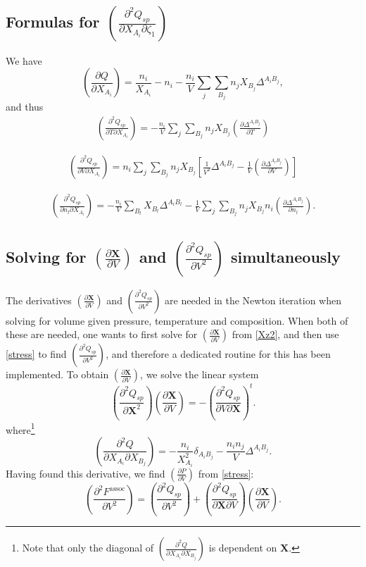\documentclass[english]{../thermomemo/thermomemo}
\newcommand{\mbf}[0]{\mathbf}
\newcommand*{\pder}[2]{\left(\frac{\partial #1}{\partial #2}\right)}
\newcommand*{\pdder}[2]{\left(\frac{\partial^2 #1}{\partial #2^2}\right)}
\newcommand*{\pdcross}[3]{\left(\frac{\partial^2 #1}{\partial #2 \partial #3}\right)}
\newcommand{\z}{\zeta}
\begin{document}
\subsection{Formulas for $\pdcross{Q_{sp}}{X_{A_i}}{\z_1}$}
We have
\begin{equation}
  \pder{Q}{X_{A_i}} = \frac{n_i}{X_{A_i}} - n_i  - \frac{n_i}{V} \sum_{j} \sum_{B_j} n_j X_{B_j} \Delta^{A_i B_j},
\end{equation}
and thus
\begin{align*}
  \pdcross{Q_{sp}}{T}{X_{A_i}} = -\frac{n_i}{V} \sum_{j} \sum_{B_j} n_j X_{B_j} \pder{\Delta^{A_i B_j}}{T}
\end{align*}

\begin{align*}
  \pdcross{Q_{sp}}{V}{X_{A_i}} = n_i \sum_{j} \sum_{B_j} n_j X_{B_j} \left[ \frac{1}{V^2} \Delta^{A_i B_j} - \frac{1}{V} \pder{\Delta^{A_i B_j}}{V} \right]
\end{align*}

\begin{align*}
  \pdcross{Q_{sp}}{n_l}{X_{A_i}} = - \frac{n_i}{V} \sum_{B_l} X_{B_l} \Delta^{A_i B_l} - \frac{1}{V} \sum_{j} \sum_{B_j} n_j X_{B_j} n_i \pder{\Delta^{A_i B_j}}{n_l}.
\end{align*}

\subsection{Solving for $\pder{\mbf X}{V}$ and $\pdder{Q_{sp}}{V}$ simultaneously}
The derivatives $\pder{\mbf X}{V}$ and $\pdder{Q_{sp}}{V}$ are needed in the Newton iteration when solving for volume given pressure, temperature and composition. When both of these are needed, one wants to first solve for $\pder{\mbf X}{V}$ from \eqref{Xz2}, and then use \eqref{stress} to find $\pdder{Q_{sp}}{V}$, and therefore a dedicated routine for this has been implemented. To obtain $\pder{\mbf X}{V}$, we solve the linear system
\begin{equation}
  \pdder{Q_{sp}}{\mbf X} \pder{\mbf X}{V} = -\pdcross{Q_{sp}}{V}{\mbf X}^t.
\end{equation}
where\footnote{Note that only the diagonal of $\pdcross{Q}{X_{A_i}}{X_{B_j}}$ is dependent on $\mbf X$.}
\begin{equation}
  \pdcross{Q}{X_{A_i}}{X_{B_j}} = -\frac{n_i}{X_{A_i}^2} \delta_{A_i B_j} - \frac{n_i n_j}{V} \Delta^{A_i B_j}.
\end{equation}
Having found this derivative, we find $\pder{P}{V}$ from \eqref{stress}:
\begin{equation}
    \pdder{F^{\text{assoc}}}{V} = \pdder{Q_{sp}}{V} + \pdcross{Q_{sp}}{\mbf X}{V} \pder{\mbf X}{V}.
\end{equation}
\end{document}
